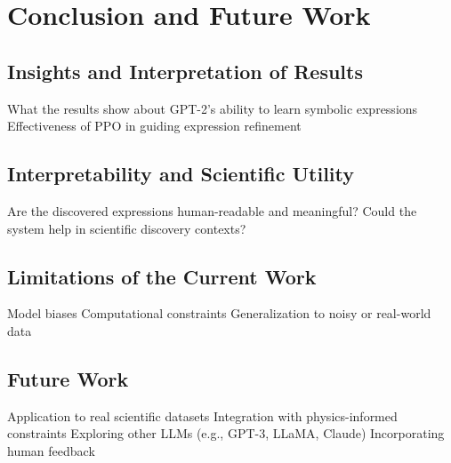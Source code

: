 \chapter{Conclusion and Future Work}

\section{Insights and Interpretation of Results}
    What the results show about GPT-2's ability to learn symbolic expressions
    Effectiveness of PPO in guiding expression refinement

\section{Interpretability and Scientific Utility}
    Are the discovered expressions human-readable and meaningful?
    Could the system help in scientific discovery contexts?

\section{Limitations of the Current Work}
    Model biases
    Computational constraints
    Generalization to noisy or real-world data

\section{Future Work}
    Application to real scientific datasets
    Integration with physics-informed constraints
    Exploring other LLMs (e.g., GPT-3, LLaMA, Claude)
    Incorporating human feedback

